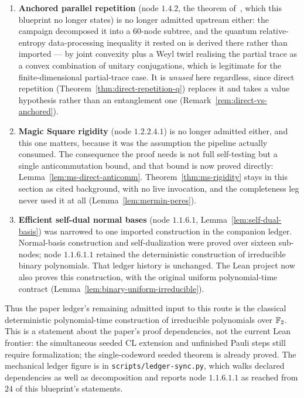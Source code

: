 \begin{remark}
\begin{enumerate}
\item \textbf{Anchored parallel repetition} (node $1.4.2$, the theorem of~\cite{BVY17}, which
  this blueprint no longer states) is no longer admitted upstream either: the campaign
  decomposed it into a $60$-node subtree, and the quantum relative-entropy data-processing
  inequality it rested on is derived there rather than imported --- by joint convexity plus a
  Weyl twirl realising the partial trace as a convex combination of unitary conjugations, which
  is legitimate for the finite-dimensional partial-trace case. It is \emph{unused} here
  regardless, since direct repetition (Theorem~\ref{thm:direct-repetition-q}) replaces it and
  takes a value hypothesis rather than an entanglement one
  (Remark~\ref{rem:direct-vs-anchored}).
\item \textbf{Magic Square rigidity} (node $1.2.2.4.1$) is no longer admitted either, and
  this one matters, because it was the assumption the pipeline actually consumed. The
  consequence the proof needs is not full self-testing but a single anticommutation bound,
  and that bound is now proved directly: Lemma~\ref{lem:ms-direct-anticomm}.
  Theorem~\ref{thm:ms-rigidity} stays in this section as cited background, with no live
  invocation, and the completeness leg never used it at all
  (Lemma~\ref{lem:mermin-peres}).
\item \textbf{Efficient self-dual normal bases} (node $1.1.6.1$,
  Lemma~\ref{lem:self-dual-basis}) was narrowed to one imported construction in the
  companion ledger. Normal-basis construction and self-dualization were proved over
  sixteen sub-nodes; node $1.1.6.1.1$ retained the deterministic construction of
  irreducible binary polynomials. That ledger history is unchanged. The Lean project
  now also proves this construction, with the original uniform polynomial-time contract
  (Lemma~\ref{lem:binary-uniform-irreducible}).
\end{enumerate}

Thus the paper ledger's remaining admitted input to this route is the classical
deterministic polynomial-time construction of irreducible polynomials over $\mathbb{F}_2$.
This is a statement about the paper's proof dependencies, not the current Lean frontier:
the simultaneous seeded CL extension and unfinished Pauli steps still require
formalization; the single-codeword seeded theorem is already proved. The mechanical ledger figure is in
\texttt{scripts/ledger-sync.py}, which walks declared dependencies as well as decomposition
and reports node $1.1.6.1.1$ as reached from $24$ of this blueprint's statements.


\end{remark}
